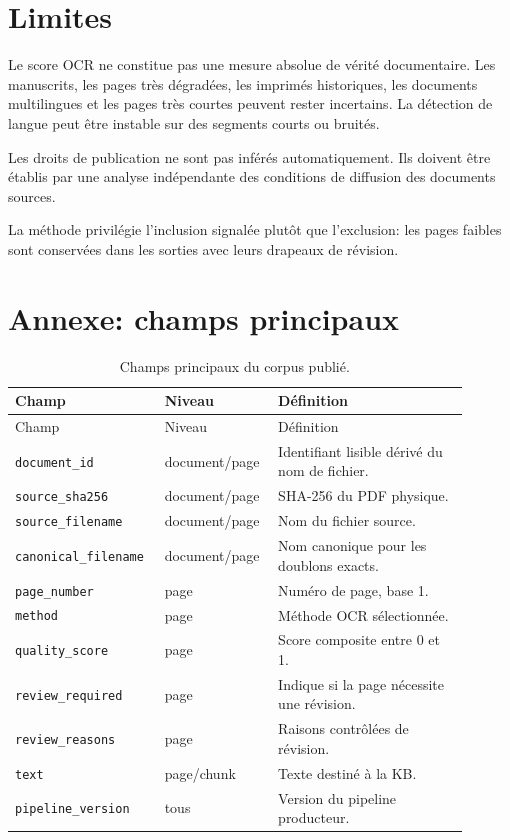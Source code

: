 \documentclass[11pt,a4paper]{article}
\begin{document}
\section{Limites}

Le score OCR ne constitue pas une mesure absolue de vérité documentaire. Les manuscrits, les pages très dégradées, les imprimés historiques, les documents multilingues et les pages très courtes peuvent rester incertains. La détection de langue peut être instable sur des segments courts ou bruités.

Les droits de publication ne sont pas inférés automatiquement. Ils doivent être établis par une analyse indépendante des conditions de diffusion des documents sources.

La méthode privilégie l'inclusion signalée plutôt que l'exclusion: les pages faibles sont conservées dans les sorties avec leurs drapeaux de révision.

\section{Annexe: champs principaux}

\begin{longtable}{p{0.30\linewidth}p{0.20\linewidth}p{0.40\linewidth}}
\caption{Champs principaux du corpus publié.}\\
\toprule
Champ & Niveau & Définition \\
\midrule
\endfirsthead
\toprule
Champ & Niveau & Définition \\
\midrule
\endhead
\texttt{document\_id} & document/page & Identifiant lisible dérivé du nom de fichier. \\
\texttt{source\_sha256} & document/page & SHA-256 du PDF physique. \\
\texttt{source\_filename} & document/page & Nom du fichier source. \\
\texttt{canonical\_filename} & document/page & Nom canonique pour les doublons exacts. \\
\texttt{page\_number} & page & Numéro de page, base 1. \\
\texttt{method} & page & Méthode OCR sélectionnée. \\
\texttt{quality\_score} & page & Score composite entre 0 et 1. \\
\texttt{review\_required} & page & Indique si la page nécessite une révision. \\
\texttt{review\_reasons} & page & Raisons contrôlées de révision. \\
\texttt{text} & page/chunk & Texte destiné à la KB. \\
\texttt{pipeline\_version} & tous & Version du pipeline producteur. \\
\bottomrule
\end{longtable}
\end{document}
